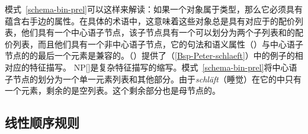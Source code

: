 模式~\ref{schema-bin-prel}可以这样来解读：如果一个对象属于类型，那么它必须具有蕴含右手边的属性。在具体的术语中，这意味着这些对象总是具有对应于的配价列表，他们具有一个中心语子节点，该子节点具有一个可以划分为两个子列表和的配价列表，而且他们具有一个非中心语子节点，它的句法和语义属性（\synsemv ）与中心语子节点的\subcatl 的最后一个元素是兼容的。（）提供了（\ref{Bsp-Peter-schlaeft}）中的例子的相对应的特征描写。
\ea
{}
\z
\addlines
NP[]是复杂特征描写的缩写。模式~\ref{schema-bin-prel}将中心语子节点的\subcatl 划分为一个单一元素列表和其他部分。由于\emph{schläft}（睡觉）在它的\subcatl 中只有一个元素，剩余的是空列表。这个剩余部分也是母节点的\subcatv 。

\subsection{线性顺序规则}
\label{Abschnitt-LP-Regeln-HPSG}

